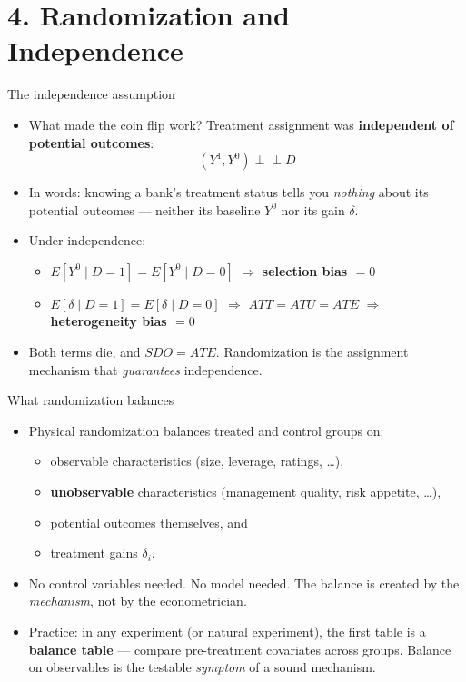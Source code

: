 \documentclass[
  11pt,
  ignorenonframetext,
  aspectratio=169,
]{beamer}
\providecommand{\tightlist}{%
  \setlength{\itemsep}{0pt}\setlength{\parskip}{0pt}}
\newcommand{\indep}{\perp\!\!\!\perp}
\begin{document}
\section{4. Randomization and
Independence}\label{randomization-and-independence}

\begin{frame}{The independence assumption}
\protect{}\label{the-independence-assumption}
\begin{itemize}
\tightlist
\item
  What made the coin flip work? Treatment assignment was
  \textbf{independent of potential outcomes}: \[
  (Y^1, Y^0) \indep D
  \]
\item
  In words: knowing a bank's treatment status tells you \emph{nothing}
  about its potential outcomes --- neither its baseline \(Y^0\) nor its
  gain \(\delta\).
\item
  Under independence:

  \begin{itemize}
  \tightlist
  \item
    \(E[Y^0 \mid D{=}1] = E[Y^0 \mid D{=}0]\) \(\Rightarrow\)
    \textbf{selection bias \(= 0\)}
  \item
    \(E[\delta \mid D{=}1] = E[\delta \mid D{=}0]\) \(\Rightarrow\)
    \(ATT = ATU = ATE\) \(\Rightarrow\) \textbf{heterogeneity bias
    \(= 0\)}
  \end{itemize}
\item
  Both terms die, and \(SDO = ATE\). Randomization is the assignment
  mechanism that \emph{guarantees} independence.
\end{itemize}
\end{frame}

\begin{frame}{What randomization balances}
\protect{}\label{what-randomization-balances}
\begin{itemize}
\tightlist
\item
  Physical randomization balances treated and control groups on:

  \begin{itemize}
  \tightlist
  \item
    observable characteristics (size, leverage, ratings, \ldots),
  \item
    \textbf{unobservable} characteristics (management quality, risk
    appetite, \ldots),
  \item
    potential outcomes themselves, and
  \item
    treatment gains \(\delta_i\).
  \end{itemize}
\item
  No control variables needed. No model needed. The balance is created
  by the \emph{mechanism}, not by the econometrician.
\item
  Practice: in any experiment (or natural experiment), the first table
  is a \textbf{balance table} --- compare pre-treatment covariates
  across groups. Balance on observables is the testable \emph{symptom}
  of a sound mechanism.
\end{itemize}
\end{frame}
\end{document}
